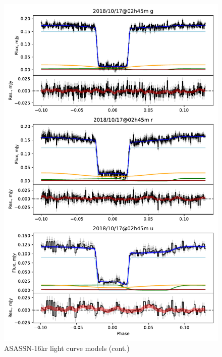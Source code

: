 \begin{figure}
    \centering
    \includegraphics[width=\textwidth]{figures/results/three_cvs_with_weird_colours/ASASSN-16kr/ASASSN-16kr_3.pdf}
    \caption{ASASSN-16kr light curve models (cont.)}
    \label{fig:ASASSN-16kr all light curves cont 2}
\end{figure}
